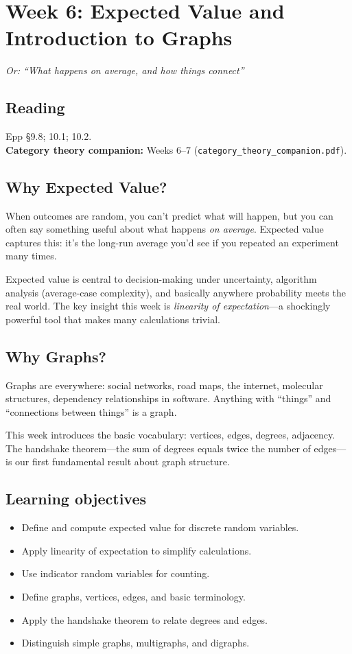 \section{Week 6: Expected Value and Introduction to Graphs}

\textit{Or: ``What happens on average, and how things connect''}

\subsection*{Reading}
Epp \S 9.8; 10.1; 10.2.\\
\textbf{Category theory companion:} Weeks 6--7 (\texttt{category\_theory\_companion.pdf}).

\subsection*{Why Expected Value?}

When outcomes are random, you can't predict what will happen, but you can often say something useful about what happens \emph{on average}. Expected value captures this: it's the long-run average you'd see if you repeated an experiment many times.

Expected value is central to decision-making under uncertainty, algorithm analysis (average-case complexity), and basically anywhere probability meets the real world. The key insight this week is \emph{linearity of expectation}---a shockingly powerful tool that makes many calculations trivial.

\subsection*{Why Graphs?}

Graphs are everywhere: social networks, road maps, the internet, molecular structures, dependency relationships in software. Anything with ``things'' and ``connections between things'' is a graph.

This week introduces the basic vocabulary: vertices, edges, degrees, adjacency. The handshake theorem---the sum of degrees equals twice the number of edges---is our first fundamental result about graph structure.

\subsection*{Learning objectives}
\begin{itemize}
  \item Define and compute expected value for discrete random variables.
  \item Apply linearity of expectation to simplify calculations.
  \item Use indicator random variables for counting.
  \item Define graphs, vertices, edges, and basic terminology.
  \item Apply the handshake theorem to relate degrees and edges.
  \item Distinguish simple graphs, multigraphs, and digraphs.
\end{itemize}

